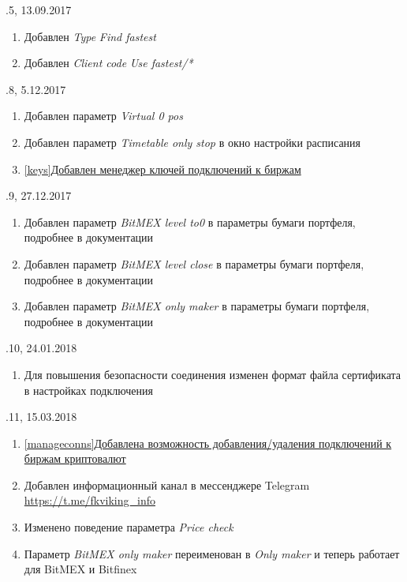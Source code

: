 \vspace{5mm}

.5, 13.09.2017
\begin{enumerate}
	\item Добавлен \textit{Type} \textit{Find fastest}
	\item Добавлен \textit{Client code} \textit{Use fastest/*}
\end{enumerate}

\vspace{5mm}

.8, 5.12.2017
\begin{enumerate}
	\item Добавлен параметр \textit{Virtual 0 pos}
	\item Добавлен параметр \textit{Timetable only stop} в окно настройки расписания
	\item \hyperref[keys]{\ref{keys}Добавлен менеджер ключей подключений к биржам}
\end{enumerate}

\vspace{5mm}

.9, 27.12.2017
\begin{enumerate}
	\item Добавлен параметр \textit{BitMEX level to0} в параметры бумаги портфеля, подробнее в документации
	\item Добавлен параметр \textit{BitMEX level close} в параметры бумаги портфеля, подробнее в документации
	\item Добавлен параметр \textit{BitMEX only maker} в параметры бумаги портфеля, подробнее в документации
\end{enumerate}

\vspace{5mm}

.10, 24.01.2018
\begin{enumerate}
	\item Для повышения безопасности соединения изменен формат файла сертификата в настройках подключения
\end{enumerate}

\vspace{5mm}

.11, 15.03.2018
\begin{enumerate}
	\item \hyperref[manageconns]{\ref{manageconns}Добавлена возможность добавления/удаления подключений к биржам криптовалют}
	\item Добавлен информационный канал в мессенджере Telegram \href{https://t.me/fkviking\_info}{https://t.me/fkviking\_info}
	\item Изменено поведение параметра \textit{Price check}
	\item Параметр \textit{BitMEX only maker} переименован в \textit{Only maker} и теперь работает для BitMEX и Bitfinex
\end{enumerate}

